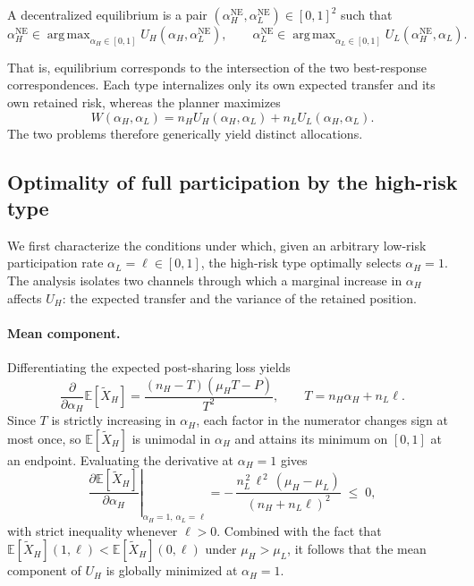 \documentclass[a4paper,12pt]{article}
\theoremstyle{definition}
\theoremstyle{remark}
\newcommand{\E}{\mathbb{E}}
\newcommand{\1}{\mathbf{1}}
\DeclareMathOperator*{\argmax}{arg\,max}
\begin{document}
A decentralized equilibrium is a pair
\((\alpha_H^{\mathrm{NE}},\alpha_L^{\mathrm{NE}})\in[0,1]^2\) such that
\[
\alpha_H^{\mathrm{NE}}\in\argmax_{\alpha_H\in[0,1]}
U_H(\alpha_H,\alpha_L^{\mathrm{NE}}),
\qquad
\alpha_L^{\mathrm{NE}}\in\argmax_{\alpha_L\in[0,1]}
U_L(\alpha_H^{\mathrm{NE}},\alpha_L).
\]

That is, equilibrium corresponds to the intersection of the two best-response correspondences. Each type internalizes only its own expected
transfer and its own retained risk, whereas the planner maximizes
\[
W(\alpha_H,\alpha_L)=n_HU_H(\alpha_H,\alpha_L)+n_LU_L(\alpha_H,\alpha_L).
\]
The two problems therefore generically yield distinct allocations.

\subsection{Optimality of full participation by the high-risk type}
\label{sec:decentralized-fullH}

We first characterize the conditions under which, given an arbitrary
low-risk participation rate \(\alpha_L=\ell\in[0,1]\), the high-risk type
optimally selects \(\alpha_H=1\). The analysis isolates two channels through
which a marginal increase in \(\alpha_H\) affects \(U_H\): the expected
transfer and the variance of the retained position.

\paragraph{Mean component.}
Differentiating the expected post-sharing loss yields
\[
\frac{\partial}{\partial \alpha_H}\E[\tilde X_H]
=
\frac{(n_H-T)(\mu_HT-P)}{T^2},
\qquad
T=n_H\alpha_H+n_L\ell.
\]
Since \(T\) is strictly increasing in \(\alpha_H\), each factor in the
numerator changes sign at most once, so \(\E[\tilde X_H]\) is unimodal in
\(\alpha_H\) and attains its minimum on \([0,1]\) at an endpoint. Evaluating
the derivative at \(\alpha_H=1\) gives
\begin{equation}
\left.\frac{\partial \E[\tilde X_H]}{\partial \alpha_H}\right|_{\alpha_H=1,\,\alpha_L=\ell}
=
-\,\frac{n_L^{\,2}\,\ell^{\,2}\,(\mu_H-\mu_L)}{(n_H+n_L\ell)^{2}}
\;\le\;0,
\label{eq:dEH-dalphaH-at1}
\end{equation}
with strict inequality whenever \(\ell>0\). Combined with the fact that
\(\E[\tilde X_H](1,\ell)<\E[\tilde X_H](0,\ell)\) under \(\mu_H>\mu_L\), it
follows that the mean component of \(U_H\) is globally minimized at
\(\alpha_H=1\).
\end{document}
